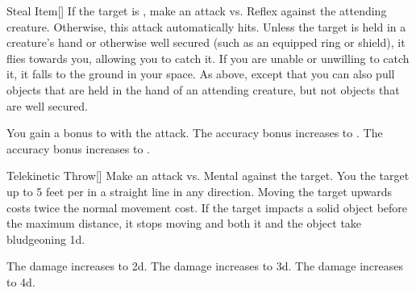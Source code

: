 \lowercase{\hypertarget{spell:Steal Item}{}}\label{spell:Steal Item}
\begin{freeability}[Rank 2]{\hypertarget{spell:Steal Item}{Steal Item}}[]
If the target is , make an attack vs. Reflex against the attending creature.
Otherwise, this attack automatically hits.
\hit Unless the target is held in a creature's hand or otherwise well secured (such as an equipped ring or shield), it flies towards you, allowing you to catch it.
If you are unable or unwilling to catch it, it falls to the ground in your space.
\crit As above, except that you can also pull objects that are held in the hand of an attending creature, but not objects that are well secured.

\rankline
{} You gain a  bonus to  with the attack.
 The accuracy bonus increases to .
 The accuracy bonus increases to .

\end{freeability}
\vspace{0.25em}



\lowercase{\hypertarget{spell:Telekinetic Throw}{}}\label{spell:Telekinetic Throw}
\begin{freeability}[Rank 2]{\hypertarget{spell:Telekinetic Throw}{Telekinetic Throw}}[]
Make an attack vs. Mental against the target.
\hit You  the target up to 5 feet per  in a straight line in any direction.
Moving the target upwards costs twice the normal movement cost.
If the target impacts a solid object before the maximum distance, it stops moving and both it and the object take bludgeoning  \plus1d.

\rankline
{} The damage increases to  \plus2d.
 The damage increases to  \plus3d.
 The damage increases to  \plus4d.

\end{freeability}
\vspace{0.25em}



